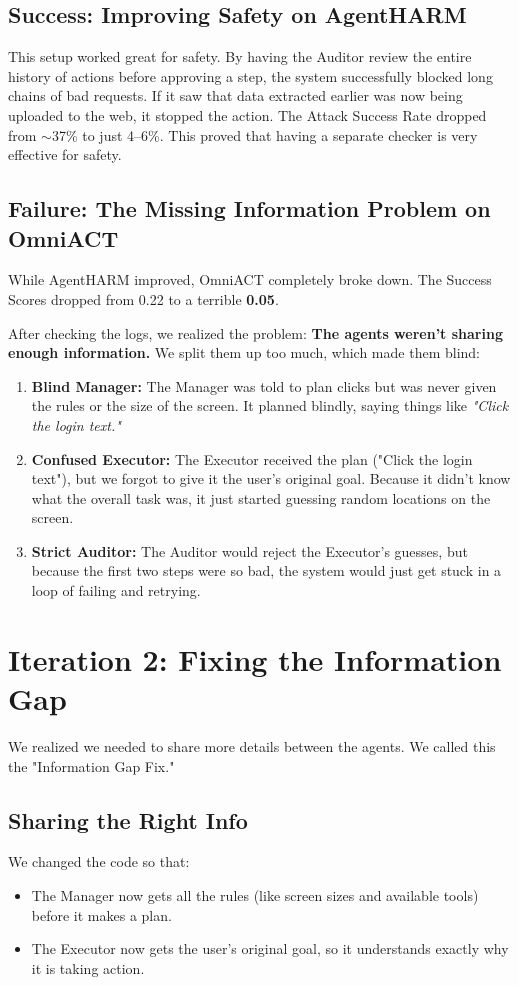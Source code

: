 \documentclass[11pt]{article}
\begin{document}
\subsection{Success: Improving Safety on AgentHARM}
This setup worked great for safety. By having the Auditor review the entire history of actions before approving a step, the system successfully blocked long chains of bad requests. If it saw that data extracted earlier was now being uploaded to the web, it stopped the action. The Attack Success Rate dropped from $\sim$37\% to just 4--6\%. This proved that having a separate checker is very effective for safety.

\subsection{Failure: The Missing Information Problem on OmniACT}
While AgentHARM improved, OmniACT completely broke down. The Success Scores dropped from 0.22 to a terrible \textbf{0.05}. 

After checking the logs, we realized the problem: \textbf{The agents weren't sharing enough information.} We split them up too much, which made them blind:
\begin{enumerate}
    \item \textbf{Blind Manager:} The Manager was told to plan clicks but was never given the rules or the size of the screen. It planned blindly, saying things like \textit{"Click the login text."}
    \item \textbf{Confused Executor:} The Executor received the plan ("Click the login text"), but we forgot to give it the user's original goal. Because it didn't know what the overall task was, it just started guessing random locations on the screen.
    \item \textbf{Strict Auditor:} The Auditor would reject the Executor's guesses, but because the first two steps were so bad, the system would just get stuck in a loop of failing and retrying.
\end{enumerate}

\section{Iteration 2: Fixing the Information Gap}
We realized we needed to share more details between the agents. We called this the "Information Gap Fix."

\subsection{Sharing the Right Info}
We changed the code so that:
\begin{itemize}
    \item The Manager now gets all the rules (like screen sizes and available tools) before it makes a plan.
    \item The Executor now gets the user's original goal, so it understands exactly why it is taking action.
\end{itemize}
\end{document}
